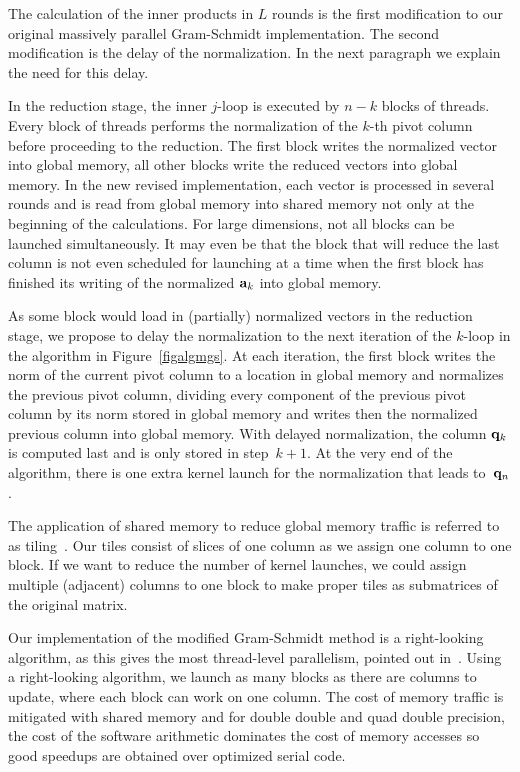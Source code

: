 \documentclass{article}
\newcommand\bfa{{\bf a}}
\newcommand\bfq{{\bf q}}
\begin{document}
The calculation of the inner products in $L$ rounds is the first
modification to our original massively parallel Gram-Schmidt implementation.
The second modification is the delay of the normalization.
In the next paragraph we explain the need for this delay.

In the reduction stage, the inner $j$-loop is executed by $n-k$ blocks
of threads.  Every block of threads performs the normalization of the
$k$-th pivot column before proceeding to the reduction.
The first block writes the normalized vector into global memory,
all other blocks write the reduced vectors into global memory.
In the new revised implementation, each vector is processed in
several rounds and is read from global memory into shared memory
not only at the beginning of the calculations.
For large dimensions, not all blocks can be launched simultaneously.
It may even be that the block that will reduce the last column
is not even scheduled for launching at a time when the first block
has finished its writing of the normalized $\bfa_k$ into global memory.

As some block would load in (partially) normalized vectors in the
reduction stage, we propose to delay the normalization to the next
iteration of the $k$-loop in the algorithm in Figure~\ref{figalgmgs}.  
At each iteration, the first block writes the norm of the current 
pivot column to a location in global memory and normalizes the previous
pivot column, dividing every component of the previous pivot column 
by its norm stored in global memory and writes then the normalized 
previous column into global memory. 
With delayed normalization, the column $\bfq_k$ is computed last
and is only stored in step~$k+1$.
At the very end of the algorithm, there is one extra kernel launch
for the normalization that leads to~$\bfq_n$.

The application of shared memory to reduce global memory traffic
is referred to as tiling~\cite[pages 108-109]{KH13}.
Our tiles consist of slices of one column as we assign one column
to one block.  If we want to reduce the number of kernel launches,
we could assign multiple (adjacent) columns to one block
to make proper tiles as submatrices of the original matrix.

Our implementation of the modified Gram-Schmidt method is a
right-looking algorithm, as this gives the most thread-level
parallelism, pointed out in~\cite{VD08}.
Using a right-looking algorithm, we launch as many blocks as
there are columns to update, where each block can work on one column.
The cost of memory traffic is mitigated with shared memory
and for double double and quad double precision, the cost of
the software arithmetic dominates the cost of memory accesses
so good speedups are obtained over optimized serial code.
\end{document}

